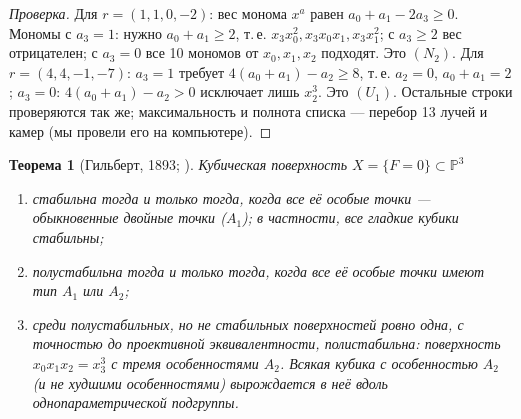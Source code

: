 \documentclass[11pt,a4paper]{article}
\theoremstyle{plain}
\newtheorem{theorem}{Теорема}[section]
\theoremstyle{definition}
\theoremstyle{remark}
\newcommand{\PP}{\mathbb{P}}
\begin{document}
\begin{proof}[Проверка]
Для $r=(1,1,0,-2)$: вес монома $x^a$ равен $a_0+a_1-2a_3\ge0$. Мономы с $a_3=1$: нужно
$a_0+a_1\ge2$, т.\,е. $x_3x_0^2,x_3x_0x_1,x_3x_1^2$; с $a_3\ge2$ вес отрицателен; с $a_3=0$ все 10
мономов от $x_0,x_1,x_2$ подходят. Это $(N_2)$. Для $r=(4,4,-1,-7)$: $a_3=1$ требует
$4(a_0+a_1)-a_2\ge8$, т.\,е. $a_2=0$, $a_0+a_1=2$; $a_3=0$: $4(a_0+a_1)-a_2>0$ исключает лишь
$x_2^3$. Это $(U_1)$. Остальные строки проверяются так же; максимальность и полнота списка --- перебор
13 лучей и камер (мы провели его на компьютере).
\end{proof}

\begin{theorem}[{Гильберт, 1893; \cite[гл.~4, \S\,2]{MFK}}]\label{thm:Hilbert}
Кубическая поверхность $X=\{F=0\}\subset\PP^3$
\begin{enumerate}
\item стабильна тогда и только тогда, когда все её особые точки --- обыкновенные двойные точки
\textup{(}$A_1$\textup{)}; в частности, все гладкие кубики стабильны;
\item полустабильна тогда и только тогда, когда все её особые точки имеют тип $A_1$ или $A_2$;
\item среди полустабильных, но не стабильных поверхностей ровно одна, с точностью до проективной
эквивалентности, полистабильна: поверхность $x_0x_1x_2=x_3^3$ с тремя особенностями $A_2$. Всякая
кубика с особенностью $A_2$ \textup{(}и не худшими особенностями\textup{)} вырождается в неё вдоль
однопараметрической подгруппы.
\end{enumerate}
\end{theorem}
\end{document}
